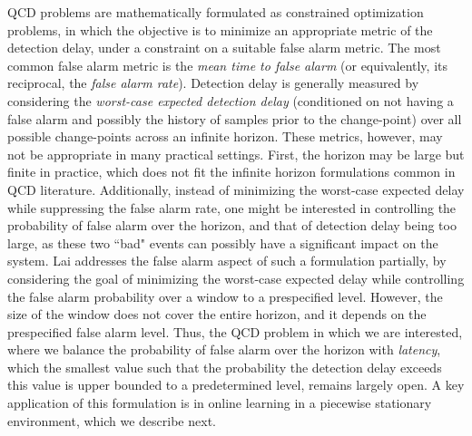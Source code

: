 \documentclass[12pt]{interact}
\theoremstyle{plain}
\newcommand{\yhh}[1]{{\color{purple}{#1}}}
\begin{document}
QCD problems are mathematically formulated as constrained optimization problems, in which the objective is to minimize an appropriate metric of the detection delay, under a constraint on a suitable false alarm metric. 
The most common false alarm metric is the \emph{mean time to false alarm} (or equivalently, its reciprocal, the \emph{false alarm rate}). 
Detection delay is generally measured by considering the \emph{worst-case expected detection delay} (conditioned on not having a false alarm and possibly the history of samples prior to the change-point) over all possible change-points across an infinite horizon.
These metrics, however, may not be appropriate in many practical settings. First, the horizon may be large but finite in practice, which does not fit the infinite horizon formulations common in QCD literature. 
Additionally, instead of minimizing the worst-case expected delay while suppressing the false alarm rate, one might be interested in controlling the probability of false alarm over the horizon, and that of detection delay being too large, as these two ``bad" events can possibly have a significant impact on the system. 
Lai \cite[Section II.B]{lai1998information}  addresses the false alarm aspect of such a formulation partially, by considering the goal of minimizing the worst-case expected delay while controlling the false alarm probability over a window to a prespecified level. However, the size of the window does not cover the entire horizon, and it depends on the prespecified false alarm level. 
Thus, the QCD problem in which we are interested, where we balance the probability of false alarm over the horizon with \emph{latency}, which the smallest value such that the probability the detection delay exceeds this value is upper bounded to a predetermined level,  remains largely open. A key application of this formulation is in online learning in a piecewise stationary environment, which we describe next.
\end{document}
